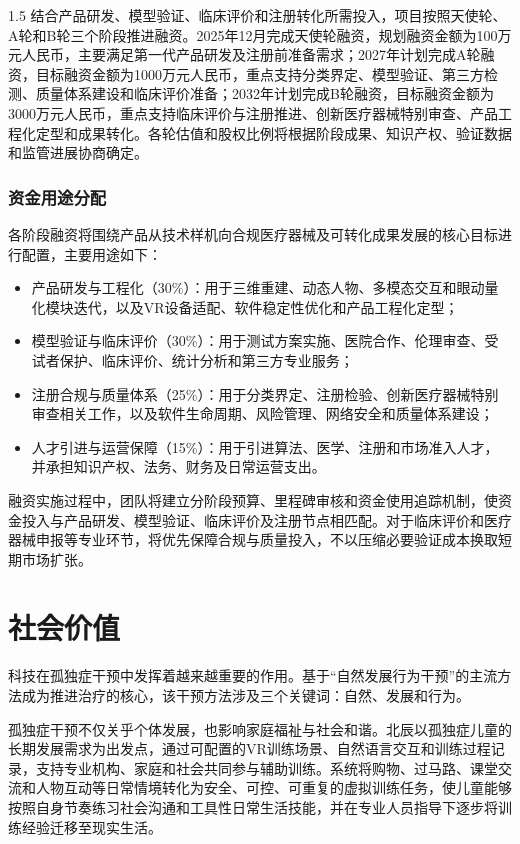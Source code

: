\documentclass[zihao=-4]{ctexart}
\begin{document}
\begin{spacing}{1.5}
结合产品研发、模型验证、临床评价和注册转化所需投入，项目按照天使轮、A轮和B轮三个阶段推进融资。2025年12月完成天使轮融资，规划融资金额为100万元人民币，主要满足第一代产品研发及注册前准备需求；2027年计划完成A轮融资，目标融资金额为1000万元人民币，重点支持分类界定、模型验证、第三方检测、质量体系建设和临床评价准备；2032年计划完成B轮融资，目标融资金额为3000万元人民币，重点支持临床评价与注册推进、创新医疗器械特别审查、产品工程化定型和成果转化。各轮估值和股权比例将根据阶段成果、知识产权、验证数据和监管进展协商确定。

\subsubsection{资金用途分配}

各阶段融资将围绕产品从技术样机向合规医疗器械及可转化成果发展的核心目标进行配置，主要用途如下：

\begin{itemize}[leftmargin=2em]
  \item 产品研发与工程化（30\%）：用于三维重建、动态人物、多模态交互和眼动量化模块迭代，以及VR设备适配、软件稳定性优化和产品工程化定型；
  \item 模型验证与临床评价（30\%）：用于测试方案实施、医院合作、伦理审查、受试者保护、临床评价、统计分析和第三方专业服务；
  \item 注册合规与质量体系（25\%）：用于分类界定、注册检验、创新医疗器械特别审查相关工作，以及软件生命周期、风险管理、网络安全和质量体系建设；
  \item 人才引进与运营保障（15\%）：用于引进算法、医学、注册和市场准入人才，并承担知识产权、法务、财务及日常运营支出。
\end{itemize}

融资实施过程中，团队将建立分阶段预算、里程碑审核和资金使用追踪机制，使资金投入与产品研发、模型验证、临床评价及注册节点相匹配。对于临床评价和医疗器械申报等专业环节，将优先保障合规与质量投入，不以压缩必要验证成本换取短期市场扩张。

\section{社会价值}

科技在孤独症干预中发挥着越来越重要的作用。基于“自然发展行为干预”的主流方法成为推进治疗的核心，该干预方法涉及三个关键词：自然、发展和行为\cite{ref43}。

孤独症干预不仅关乎个体发展，也影响家庭福祉与社会和谐。北辰以孤独症儿童的长期发展需求为出发点，通过可配置的VR训练场景、自然语言交互和训练过程记录，支持专业机构、家庭和社会共同参与辅助训练。系统将购物、过马路、课堂交流和人物互动等日常情境转化为安全、可控、可重复的虚拟训练任务，使儿童能够按照自身节奏练习社会沟通和工具性日常生活技能，并在专业人员指导下逐步将训练经验迁移至现实生活。


\end{spacing}
\end{document}
